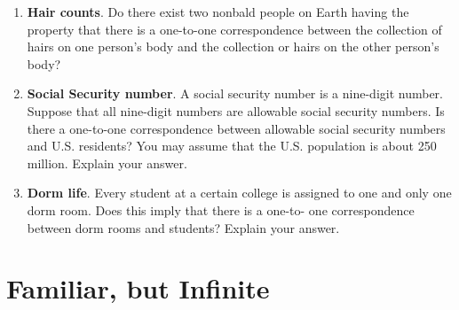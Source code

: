 \begin{enumerate}
\vfill 

\item \textbf{Hair counts}. Do there exist two nonbald people on Earth having the property that there is a one-to-one correspondence between the collection of hairs on one person's body and the collection or hairs on the other person's body? 

\vfill \item \textbf{Social Security number}. A social security number is a nine-digit number. Suppose that all nine-digit numbers are allowable social security numbers. Is there a one-to-one correspondence between allowable social security numbers and U.S. residents? You may assume that the U.S. population is about 250 million. Explain your answer.



\vfill \item \textbf{Dorm life}. Every student at a certain college is assigned to one and only one dorm room. Does this imply that there is a one-to- one correspondence between dorm rooms and students? Explain your answer. \vfill
\end{enumerate}

\clearpage
\section{Familiar, but Infinite} \label{Infinite}

